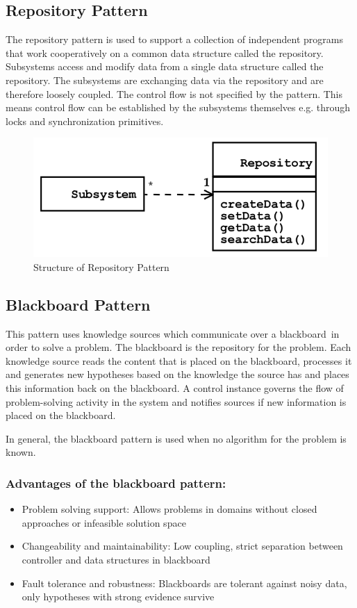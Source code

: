 \subsection{Repository Pattern}
The repository pattern is used to support a collection of independent programs that work cooperatively on a common data structure called the repository.
Subsystems access and modify data from a single data structure called the repository.
The subsystems are exchanging data via the repository and are therefore loosely coupled.
The control flow is not specified by the pattern.
This means control flow can be established by the subsystems themselves e.g. through
locks and synchronization primitives.\newline
\begin{figure}[h]
	\centering
	\includegraphics[width=0.7\linewidth]{images/pattern_repository.png}
	\caption{Structure of Repository Pattern}
\end{figure}
\newpage


\subsection{Blackboard Pattern}
This pattern uses knowledge sources which communicate over a \glqq blackboard\grqq \ in order to solve a problem.
The blackboard is the repository for the problem.
Each knowledge source reads the content that is placed on the blackboard, processes it and generates new hypotheses based on the knowledge the source has and places this information back on the blackboard.
A control instance governs the flow of problem-solving activity in the system and notifies sources if new information is placed on the blackboard.

In general, the blackboard pattern is used when no algorithm for the problem is known.

\subsubsection*{Advantages of the blackboard pattern:}
\begin{itemize}
	\item Problem solving support:
		\subitem Allows problems in domains without closed approaches or infeasible solution space
	\item Changeability and maintainability:
		\subitem Low coupling, strict separation between controller	and data structures in blackboard
	\item Fault tolerance and robustness:
		\subitem Blackboards  are tolerant against noisy data, only hypotheses with strong evidence survive
\end{itemize}

